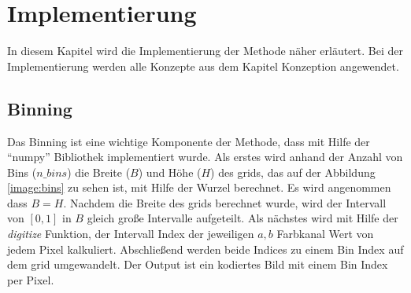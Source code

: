 \chapter{Implementierung}
In diesem Kapitel wird die Implementierung der Methode näher erläutert. Bei der Implementierung werden alle Konzepte aus dem
Kapitel Konzeption angewendet.



  

\section{Binning}
Das Binning ist eine wichtige Komponente der Methode, dass mit Hilfe der ``numpy'' Bibliothek implementiert wurde. Als erstes wird 
anhand der Anzahl von Bins ($n\_bins$) die Breite ($B$) und Höhe ($H$) des \gls{grid}s, das auf der Abbildung \ref{image:bins} zu sehen ist,
mit Hilfe der Wurzel berechnet. Es wird angenommen dass $B = H$.
Nachdem die Breite des \gls{grid}s berechnet wurde, wird der Intervall von $[0, 1]$ in $B$ gleich große Intervalle aufgeteilt. Als nächstes
wird mit Hilfe der \textit{digitize} Funktion, der Intervall Index der jeweiligen $a, b$ Farbkanal Wert von jedem Pixel kalkuliert. 
Abschließend werden beide Indices zu einem Bin Index auf dem \gls{grid} umgewandelt. Der Output ist ein kodiertes Bild mit einem Bin Index per Pixel.
\\

